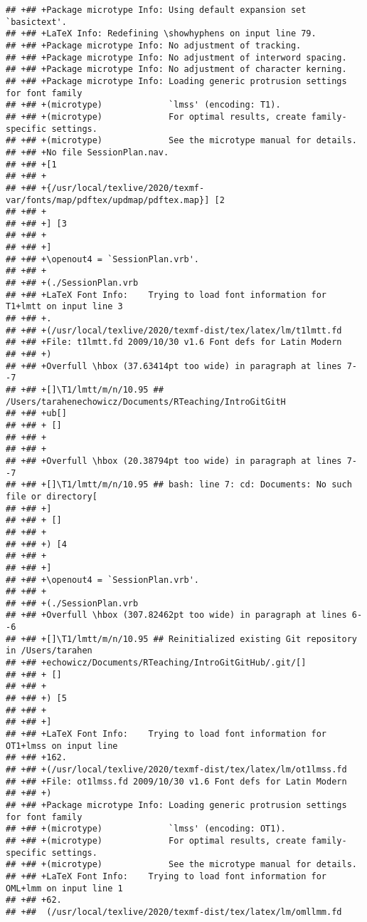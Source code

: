 \documentclass[ignorenonframetext,]{beamer}
\begin{document}
\begin{verbatim}
## +## +Package microtype Info: Using default expansion set `basictext'.
## +## +LaTeX Info: Redefining \showhyphens on input line 79.
## +## +Package microtype Info: No adjustment of tracking.
## +## +Package microtype Info: No adjustment of interword spacing.
## +## +Package microtype Info: No adjustment of character kerning.
## +## +Package microtype Info: Loading generic protrusion settings for font family
## +## +(microtype)             `lmss' (encoding: T1).
## +## +(microtype)             For optimal results, create family-specific settings.
## +## +(microtype)             See the microtype manual for details.
## +## +No file SessionPlan.nav.
## +## +[1
## +## +
## +## +{/usr/local/texlive/2020/texmf-var/fonts/map/pdftex/updmap/pdftex.map}] [2
## +## +
## +## +] [3
## +## +
## +## +]
## +## +\openout4 = `SessionPlan.vrb'.
## +## +
## +## +(./SessionPlan.vrb
## +## +LaTeX Font Info:    Trying to load font information for T1+lmtt on input line 3
## +## +.
## +## +(/usr/local/texlive/2020/texmf-dist/tex/latex/lm/t1lmtt.fd
## +## +File: t1lmtt.fd 2009/10/30 v1.6 Font defs for Latin Modern
## +## +)
## +## +Overfull \hbox (37.63414pt too wide) in paragraph at lines 7--7
## +## +[]\T1/lmtt/m/n/10.95 ## /Users/tarahenechowicz/Documents/RTeaching/IntroGitGitH
## +## +ub[] 
## +## + []
## +## +
## +## +
## +## +Overfull \hbox (20.38794pt too wide) in paragraph at lines 7--7
## +## +[]\T1/lmtt/m/n/10.95 ## bash: line 7: cd: Documents: No such file or directory[
## +## +] 
## +## + []
## +## +
## +## +) [4
## +## +
## +## +]
## +## +\openout4 = `SessionPlan.vrb'.
## +## +
## +## +(./SessionPlan.vrb
## +## +Overfull \hbox (307.82462pt too wide) in paragraph at lines 6--6
## +## +[]\T1/lmtt/m/n/10.95 ## Reinitialized existing Git repository in /Users/tarahen
## +## +echowicz/Documents/RTeaching/IntroGitGitHub/.git/[] 
## +## + []
## +## +
## +## +) [5
## +## +
## +## +]
## +## +LaTeX Font Info:    Trying to load font information for OT1+lmss on input line 
## +## +162.
## +## +(/usr/local/texlive/2020/texmf-dist/tex/latex/lm/ot1lmss.fd
## +## +File: ot1lmss.fd 2009/10/30 v1.6 Font defs for Latin Modern
## +## +)
## +## +Package microtype Info: Loading generic protrusion settings for font family
## +## +(microtype)             `lmss' (encoding: OT1).
## +## +(microtype)             For optimal results, create family-specific settings.
## +## +(microtype)             See the microtype manual for details.
## +## +LaTeX Font Info:    Trying to load font information for OML+lmm on input line 1
## +## +62.
## +##  (/usr/local/texlive/2020/texmf-dist/tex/latex/lm/omllmm.fd

\end{verbatim}
\end{document}
